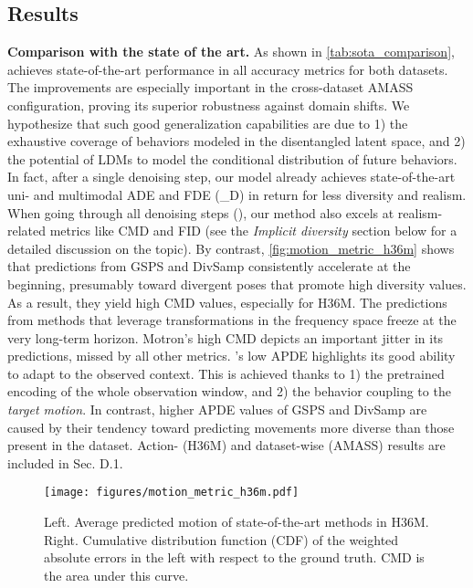 \documentclass[10pt,twocolumn,letterpaper]{article}
\begin{document}
\subsection{Results}
\label{subsec:results}





\textbf{Comparison with the state of the art.} As shown in \autoref{tab:sota_comparison}, \modelname{} achieves state-of-the-art performance in all accuracy metrics for both datasets. The improvements are especially important in the cross-dataset AMASS configuration, proving its superior robustness against domain shifts. We hypothesize that such good generalization capabilities are due to 1) the exhaustive coverage of behaviors modeled in the disentangled latent space, and 2) the potential of LDMs to model the conditional distribution of future behaviors. In fact, after a single denoising step, our model already achieves state-of-the-art uni- and multimodal ADE and FDE (\modelname{}\_D) in return for less diversity and realism.
When going through all denoising steps (\modelname{}), our method also excels at realism-related metrics like CMD and FID (see the \textit{Implicit diversity} section below for a detailed discussion on the topic).
By contrast, \autoref{fig:motion_metric_h36m} shows that predictions from GSPS and DivSamp consistently accelerate at the beginning, presumably toward divergent poses that promote high diversity values. As a result, they yield high CMD values, especially for H36M.  
The predictions from methods that leverage transformations in the frequency space freeze at the very long-term horizon. 
Motron's high CMD depicts an important jitter in its predictions, missed by all other metrics.
\modelname{}'s low APDE highlights its good ability to adapt to the observed context. This is achieved thanks to 1) the pretrained encoding of the whole observation window, and 2) the behavior coupling to the \textit{target motion}. In contrast, higher APDE values of GSPS and DivSamp are caused by their tendency toward predicting movements more diverse than those present in the dataset. Action- (H36M) and dataset-wise (AMASS) results are included in \supp{} Sec. D.1. 

\begin{figure}
    \centering
    \texttt{[image: figures/motion\_metric\_h36m.pdf]}
    \vspace{-0.5cm}
    \caption{Left. Average predicted motion of state-of-the-art methods in H36M. Right. Cumulative distribution function (CDF) of the weighted absolute errors in the left with respect to the ground truth. CMD is the area under this curve.}
    \label{fig:motion_metric_h36m}
    \vspace{-0.4cm}
\end{figure}
\end{document}
